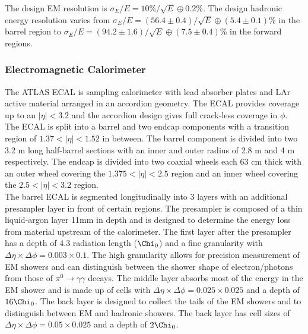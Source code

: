 \indent The design EM resolution is $\sigma_E/E = 10\%/\sqrt{E} \oplus 0.2\%$. The design hadronic energy resolution varies from $\sigma_E/E = (56.4\pm0.4)/\sqrt{E}\oplus(5.4\pm0.1)$\% in the barrel region to $\sigma_E/E = (94.2\pm1.6)/\sqrt{E}\oplus(7.5\pm0.4)$\% in the forward regions. \\

\subsubsection*{Electromagnetic Calorimeter}

\indent The ATLAS ECAL is sampling calorimeter with lead absorber plates and LAr active material arranged in an accordion geometry.  The ECAL provides coverage up to an $|\eta| < 3.2 $ and the accordion design gives full crack-less coverage in $\phi$. \\%

\indent The ECAL is split into a barrel and two endcap components with a transition region of $1.37 < |\eta| < 1.52$ in between.  The barrel component is divided into two 3.2 m long half-barrel sections with an inner and outer radius of 2.8 m and 4 m respectively.  The endcap is divided into two coaxial wheels each 63 cm thick with an outer wheel covering the $1.375 < |\eta| < 2.5$ region and an inner wheel covering the $2.5 < |\eta| < 3.2$ region. \\

\indent The barrel ECAL is segmented longitudinally into 3 layers with an additional presampler layer in front of certain regions.  The presampler is composed of a thin liquid-argon layer 11mm in depth and is designed to determine the energy loss from material upstream of the calorimeter.  The first layer after the presampler has a depth of 4.3 radiation length ($\Chi_0$) and a fine granularity with $\Delta\eta \times \Delta\phi = 0.003 \times 0.1$.  The high granularity allows for precision measurement of EM showers and can distinguish between the shower shape of electron/photons from those of $\pi^0\rightarrow \gamma\gamma$ decays.  The middle layer absorbs most of the energy in the EM shower and is made up of cells with $\Delta\eta \times \Delta\phi = 0.025 \times 0.025$ and a depth of $16 \Chi_0$.  The back layer is designed to collect the tails of the EM showers and to distinguish between EM and hadronic showers. The back layer has cell sizes of $\Delta\eta \times \Delta\phi = 0.05 \times 0.025$ and a depth of $2 \Chi_0$.  \\

